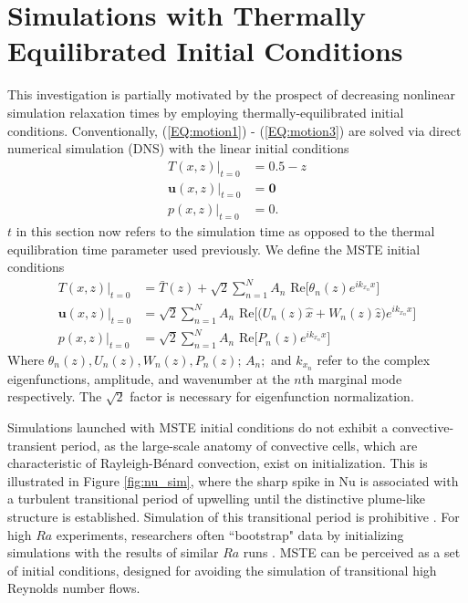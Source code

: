 \documentclass[reprint,amsmath,amssymb,aps]{revtex4-1}
\newcommand\Nu{\mathrm{Nu}}
\begin{document}
\section{Simulations with Thermally Equilibrated Initial Conditions}
This investigation is partially motivated by the prospect of decreasing nonlinear simulation relaxation times by employing thermally-equilibrated initial conditions. 
Conventionally, (\ref{EQ:motion1}) - (\ref{EQ:motion3}) are solved via direct numerical simulation (DNS) with the linear initial conditions
\begin{align}
    T(x, z)\big|_{t=0} &= 0.5 - z \\
    \mathbf{u}(x, z)\big|_{t=0} &= \mathbf{0} \\
    p(x, z)\big|_{t=0} &= 0.
\end{align}
$t$ in this section now refers to the simulation time as opposed to the thermal equilibration time parameter used previously. 
We define the MSTE initial conditions
\begin{align}
    T(x, z)\big|_{t=0} &= \bar{T}(z) + \sqrt{2} \sum_{n=1}^N  A_n \text{ Re} \Big[ \theta_n(z) e^{ik_{x_n}x} \Big] \nonumber \\
    \mathbf{u}(x, z)\big|_{t=0} &= \sqrt{2} \sum_{n=1}^N A_n \text{ Re} \Big[\Big( U_n (z) \hat{x} + W_n(z) \hat{z} \Big) e^{ik_{x_n}x} \Big] \nonumber\\
    p(x, z)\big|_{t=0} &= \sqrt{2} \sum_{n=1}^N A_n \text{ Re} \Big[P_n (z) e^{ik_{x_n}x}\Big]
\end{align}
Where $\theta_n(z), U_n(z), W_n(z), P_n(z); \, A_n; $ and $k_{x_n}$ refer to the complex eigenfunctions, amplitude, and wavenumber at the $n$th marginal mode respectively. 
The $\sqrt{2}$ factor is necessary for eigenfunction normalization. 

Simulations launched with MSTE initial conditions do not exhibit a convective-transient period, as the large-scale anatomy of convective cells, which are characteristic of Rayleigh-B\'enard convection, exist on initialization. 
This is illustrated in Figure \ref{fig:nu_sim}, where the sharp spike in $\Nu$ is associated with a turbulent transitional period of upwelling until the distinctive plume-like structure is established. 
Simulation of this transitional period is prohibitive \cite{Anders_AE}. 
For high $Ra$ experiments, researchers often  ``bootstrap" data by initializing simulations with the results of similar $Ra$ runs \cite{Verzicco, Johnston}. 
MSTE can be perceived as a set of initial conditions, designed for avoiding the simulation of transitional high Reynolds number flows.
\end{document}
